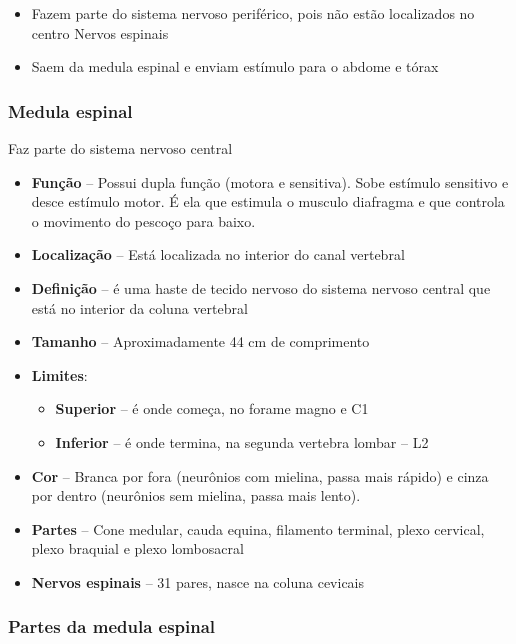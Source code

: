\documentclass[
]{book}
\providecommand{\tightlist}{%
  \setlength{\itemsep}{0pt}\setlength{\parskip}{0pt}}
\begin{document}
\begin{itemize}
\tightlist
\item
  Fazem parte do sistema nervoso periférico, pois não estão localizados no centro
  Nervos espinais
\item
  Saem da medula espinal e enviam estímulo para o abdome e tórax
\end{itemize}

\hypertarget{medula-espinal}{%
\subsubsection{Medula espinal}\label{medula-espinal}}

Faz parte do sistema nervoso central

\begin{itemize}
\tightlist
\item
  \textbf{Função} -- Possui dupla função (motora e sensitiva). Sobe estímulo sensitivo e desce estímulo motor. É ela
  que estimula o musculo diafragma e que controla o movimento do pescoço para baixo.
\item
  \textbf{Localização} -- Está localizada no interior do canal vertebral
\item
  \textbf{Definição} -- é uma haste de tecido nervoso do sistema nervoso central que está no interior da coluna vertebral
\item
  \textbf{Tamanho} -- Aproximadamente 44 cm de comprimento
\item
  \textbf{Limites}:

  \begin{itemize}
  \tightlist
  \item
    \textbf{Superior} -- é onde começa, no forame magno e C1
  \item
    \textbf{Inferior} -- é onde termina, na segunda vertebra lombar -- L2
  \end{itemize}
\item
  \textbf{Cor} -- Branca por fora (neurônios com mielina, passa mais rápido) e cinza por dentro (neurônios sem mielina, passa mais lento).
\item
  \textbf{Partes} -- Cone medular, cauda equina, filamento terminal, plexo cervical, plexo braquial e plexo lombosacral
\item
  \textbf{Nervos espinais} -- 31 pares, nasce na coluna cevicais
\end{itemize}

\hypertarget{partes-da-medula-espinal}{%
\subsubsection{Partes da medula espinal}\label{partes-da-medula-espinal}}
\end{document}
